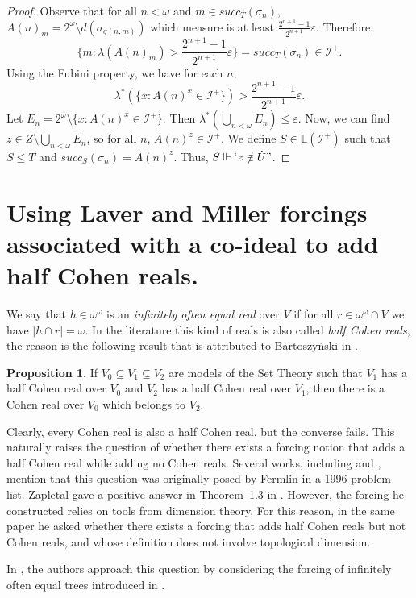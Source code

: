 \documentclass{amsart}
\theoremstyle{definition}
\newtheorem{proposition}[theorem]{Proposition}
\theoremstyle{remark}
\numberwithin{equation}{section}
\newcommand{\li}{\mathbb{L}(\mathcal{I}^+)}
\newcommand{\id}{\mathcal{I}}
\begin{document}
\begin{proof}
Observe that for all $n<\omega$ and $m\in succ_T(\sigma_n)$, $A(n)_m=2^\omega\setminus d(\sigma_{g(n,m)})$ which measure is at least $\frac{2^{n+1}-1}{2^{n+1}}\varepsilon$. Therefore, 
\[
\{m:\lambda(A(n)_m)>\frac{2^{n+1}-1}{2^{n+1}}\varepsilon\}=succ_T(\sigma_n)\in\id^+.
\] 
Using the Fubini property, we have for each $n$, 
\[ 
\lambda^*(\{x:A(n)^x\in \id^+ \})>\frac{2^{n+1}-1}{2^{n+1}}\varepsilon.
\] 
Let $E_n=2^\omega\setminus\{x:A(n)^x\in\id^+\}$. Then $\lambda^*(\bigcup_{n<\omega}E_n)\leq \varepsilon$. Now, we can find $z\in Z\setminus \bigcup_{n<\omega}E_n$, so for all $n$, $A(n)^z\in\id^+$. We define $S\in \li$ such that $S\leq T$ and $succ_S(\sigma_n)=A(n)^z$. Thus, $S\Vdash` z\notin \dot U"$.
\end{proof}



\section{Using Laver and Miller forcings associated with a co-ideal to add half Cohen reals.}

We say that $h\in\omega^\omega$ is an \emph{infinitely often equal real} over $V$ if for all $r\in\omega^\omega \cap V$ we have $|h\cap r|=\omega$. In the literature this kind of reals is also called \emph{half Cohen reals}, the reason is the following result that is attributed to Bartoszy\'{n}ski in \cite{fullmil}.

\begin{proposition}
    If $V_0\subseteq V_1\subseteq V_2$ are models of the Set Theory such that $V_1$ has a half Cohen real over $V_0$ and $V_2$ has a half Cohen real over $V_1$, then there is a Cohen real over $V_0$ which belongs to $V_2$.
\end{proposition}

Clearly, every Cohen real is also a half Cohen real, but the converse fails. This naturally raises the question of whether there exists a forcing notion that adds a half Cohen real while adding no Cohen reals. Several works, including \cite{fullmil} and \cite{hc}, mention that this question was originally posed by Fermlin in a 1996 problem list. Zapletal gave a positive answer in Theorem~1.3 in \cite{hc}. However, the forcing he constructed relies on tools from dimension theory. For this reason, in the same paper he asked whether there exists a forcing that adds half Cohen reals but not Cohen reals, and whose definition does not involve topological dimension.

In \cite{fullmil}, the authors approach this question by considering the forcing of infinitely often equal trees introduced in \cite{ioe}.
\end{document}
